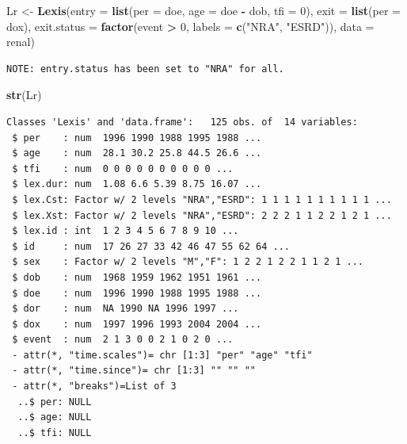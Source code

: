 \documentclass[
]{book}
\newenvironment{Shaded}{\begin{snugshade}}{\end{snugshade}}
\newcommand{\AttributeTok}[1]{\textcolor[rgb]{0.13,0.29,0.53}{#1}}
\newcommand{\DecValTok}[1]{\textcolor[rgb]{0.00,0.00,0.81}{#1}}
\newcommand{\FunctionTok}[1]{\textcolor[rgb]{0.13,0.29,0.53}{\textbf{#1}}}
\newcommand{\NormalTok}[1]{#1}
\newcommand{\OtherTok}[1]{\textcolor[rgb]{0.56,0.35,0.01}{#1}}
\newcommand{\SpecialCharTok}[1]{\textcolor[rgb]{0.81,0.36,0.00}{\textbf{#1}}}
\newcommand{\StringTok}[1]{\textcolor[rgb]{0.31,0.60,0.02}{#1}}
\begin{document}
\begin{enumerate}
\begin{Shaded}
\begin{Highlighting}[]
\NormalTok{Lr }\OtherTok{\textless{}{-}} \FunctionTok{Lexis}\NormalTok{(}\AttributeTok{entry =} \FunctionTok{list}\NormalTok{(}\AttributeTok{per =}\NormalTok{ doe,}
                         \AttributeTok{age =}\NormalTok{ doe }\SpecialCharTok{{-}}\NormalTok{ dob,}
                         \AttributeTok{tfi =} \DecValTok{0}\NormalTok{),}
             \AttributeTok{exit =} \FunctionTok{list}\NormalTok{(}\AttributeTok{per =}\NormalTok{ dox),}
      \AttributeTok{exit.status =} \FunctionTok{factor}\NormalTok{(event }\SpecialCharTok{\textgreater{}} \DecValTok{0}\NormalTok{, }\AttributeTok{labels =} \FunctionTok{c}\NormalTok{(}\StringTok{"NRA"}\NormalTok{, }\StringTok{"ESRD"}\NormalTok{)),}
             \AttributeTok{data =}\NormalTok{ renal)}
\end{Highlighting}
\end{Shaded}

\begin{verbatim}
NOTE: entry.status has been set to "NRA" for all.
\end{verbatim}

\begin{Shaded}
\begin{Highlighting}[]
\FunctionTok{str}\NormalTok{(Lr)}
\end{Highlighting}
\end{Shaded}

\begin{verbatim}
Classes 'Lexis' and 'data.frame':   125 obs. of  14 variables:
 $ per    : num  1996 1990 1988 1995 1988 ...
 $ age    : num  28.1 30.2 25.8 44.5 26.6 ...
 $ tfi    : num  0 0 0 0 0 0 0 0 0 0 ...
 $ lex.dur: num  1.08 6.6 5.39 8.75 16.07 ...
 $ lex.Cst: Factor w/ 2 levels "NRA","ESRD": 1 1 1 1 1 1 1 1 1 1 ...
 $ lex.Xst: Factor w/ 2 levels "NRA","ESRD": 2 2 2 1 1 2 2 1 2 1 ...
 $ lex.id : int  1 2 3 4 5 6 7 8 9 10 ...
 $ id     : num  17 26 27 33 42 46 47 55 62 64 ...
 $ sex    : Factor w/ 2 levels "M","F": 1 2 2 1 2 2 1 1 2 1 ...
 $ dob    : num  1968 1959 1962 1951 1961 ...
 $ doe    : num  1996 1990 1988 1995 1988 ...
 $ dor    : num  NA 1990 NA 1996 1997 ...
 $ dox    : num  1997 1996 1993 2004 2004 ...
 $ event  : num  2 1 3 0 0 2 1 0 2 0 ...
 - attr(*, "time.scales")= chr [1:3] "per" "age" "tfi"
 - attr(*, "time.since")= chr [1:3] "" "" ""
 - attr(*, "breaks")=List of 3
  ..$ per: NULL
  ..$ age: NULL
  ..$ tfi: NULL
\end{verbatim}


\end{enumerate}
\end{document}
